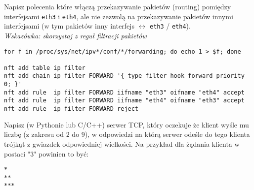 \dbEntryCheckResults
Napisz polecenia które włączą przekazywanie pakietów (routing) pomiędzy interfejsami \Verb#eth3# i \Verb#eth4#, ale nie zezwolą na przekazywanie pakietów innymi interfejsami (w tym pakietów inny interfejs $\leftrightarrow$ \Verb#eth3# / \Verb#eth4#).
\\
\textit{Wskazówka: skorzystaj z reguł filtracji pakietów}
\fi

\dbEntryCheckResults
\begin{Verbatim}
for f in /proc/sys/net/ipv*/conf/*/forwarding; do echo 1 > $f; done

nft add table ip filter
nft add chain ip filter FORWARD '{ type filter hook forward priority 0; }'
nft add rule  ip filter FORWARD iifname "eth3" oifname "eth4" accept
nft add rule  ip filter FORWARD iifname "eth4" oifname "eth3" accept
nft add rule  ip filter FORWARD reject
\end{Verbatim}
\fi


\dbEntryCheckResults
Napisz (w Pythonie lub C/C++) serwer TCP, który oczekuje że klient wyśle mu liczbę (z zakresu od 2 do 9), w odpowiedzi na którą serwer odeśle do tego klienta trójkąt z gwiazdek odpowiedniej wielkości.
Na przykład dla żądania klienta w postaci "3" powinien to być:
\begin{Verbatim}
*
**
***
\end{Verbatim}
\fi

